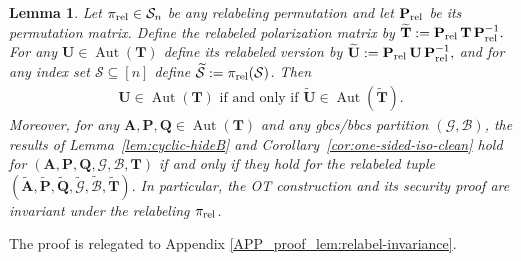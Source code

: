 \documentclass[onecolumn]{IEEEtran} %
\newcommand{\bA}{\mathbf A}
\newcommand{\bP}{\mathbf P}
\newcommand{\bQ}{\mathbf Q}
\newcommand{\bR}{\mathbf R}
\newcommand{\bU}{\mathbf U}
\newcommand{\1}{\mathbbm{1}}
\DeclareMathOperator{\Aut}{Aut}
\theoremstyle{boldremark}
\newtheorem{lemma}{Lemma}
\newcommand{\bT}{\mathbf{T}}
\begin{document}
\begin{lemma}\label{lem:relabel-invariance}
Let $\pi_{\rm rel}\in\mathcal{S}_n$ be any relabeling permutation and let
$\bP_{\rm rel}$ be its permutation matrix. Define the relabeled polarization
matrix by $\widetilde{\bT} := \bP_{\rm rel}\,\bT\,\bP_{\rm rel}^{-1}.$
For any $\bU\in\Aut(\bT)$ define its relabeled version by
$\widetilde{\bU} := \bP_{\rm rel}\,\bU\,\bP_{\rm rel}^{-1},$ 
and for any index set $\mathcal{S}\subseteq[n]$ define
$\widetilde{\mathcal{S}} := \pi_{\rm rel}(\mathcal{S})$.
Then 
\begin{align}
    \bU\in\Aut(\bT) \mbox{ if and only if } \widetilde{\bU}\in\Aut(\widetilde{\bT}).    
\end{align}
Moreover, for any $\bA,\bP,\bQ\in\Aut(\bT)$ and any \gls{gbcs}/\gls{bbcs} partition
$(\mathcal{G},\mathcal{B})$, the results of
Lemma~\ref{lem:cyclic-hideB} and Corollary~\ref{cor:one-sided-iso-clean} hold for
$(\bA,\bP,\bQ,\mathcal{G},\mathcal{B},\bT)$ if and only if they hold for the relabeled tuple
$(\widetilde{\bA},\widetilde{\bP},\widetilde{\bQ}, \widetilde{\mathcal{G}},\widetilde{\mathcal{B}},\widetilde{\bT}).$
In particular, the OT construction and its security proof are invariant under
the relabeling $\pi_{\rm rel}$.
\end{lemma}




The proof is relegated to Appendix \ref{APP_proof_lem:relabel-invariance}.
\end{document}
